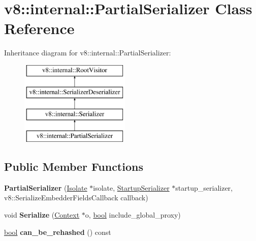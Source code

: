 \hypertarget{classv8_1_1internal_1_1PartialSerializer}{}\section{v8\+:\+:internal\+:\+:Partial\+Serializer Class Reference}
\label{classv8_1_1internal_1_1PartialSerializer}
Inheritance diagram for v8\+:\+:internal\+:\+:Partial\+Serializer\+:\begin{figure}[H]
\begin{center}
\leavevmode
\includegraphics[height=4.000000cm]{classv8_1_1internal_1_1PartialSerializer}
\end{center}
\end{figure}
\subsection*{Public Member Functions}
\begin{DoxyCompactItemize}
\item 
\mbox{\label{classv8_1_1internal_1_1PartialSerializer_ad2381119cfb2f433a7d1d1967cc4dd16}} 
{\bfseries Partial\+Serializer} (\mbox{\hyperlink{classv8_1_1internal_1_1Isolate}{Isolate}} $\ast$isolate, \mbox{\hyperlink{classv8_1_1internal_1_1StartupSerializer}{Startup\+Serializer}} $\ast$startup\+\_\+serializer, v8\+::\+Serialize\+Embedder\+Fields\+Callback callback)
\item 
\mbox{\label{classv8_1_1internal_1_1PartialSerializer_a8da4ad0333baac80268400e026b9ddaf}} 
void {\bfseries Serialize} (\mbox{\hyperlink{classv8_1_1internal_1_1Context}{Context}} $\ast$o, \mbox{\hyperlink{classbool}{bool}} include\+\_\+global\+\_\+proxy)
\item 
\mbox{\label{classv8_1_1internal_1_1PartialSerializer_a35d6fc4c99d7000661a48ded670567cb}} 
\mbox{\hyperlink{classbool}{bool}} {\bfseries can\+\_\+be\+\_\+rehashed} () const
\end{DoxyCompactItemize}
